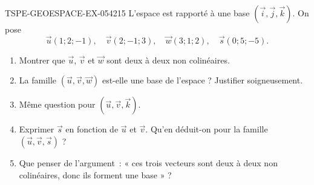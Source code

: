 \begin{exercice}{TSPE-GEOESPACE-EX-054}{2}{15}
L'espace est rapporté à une base $(\vec{i},\vec{j},\vec{k})$. On pose
\[
  \vec{u}(1;2;-1),\quad \vec{v}(2;-1;3),\quad \vec{w}(3;1;2),\quad
  \vec{s}(0;5;-5).
\]
\begin{enumerate}
  \item Montrer que $\vec{u}$, $\vec{v}$ et $\vec{w}$ sont deux à deux non
        colinéaires.
  \item La famille $(\vec{u},\vec{v},\vec{w})$ est-elle une base de l'espace ?
        Justifier soigneusement.
  \item Même question pour $(\vec{u},\vec{v},\vec{k})$.
  \item Exprimer $\vec{s}$ en fonction de $\vec{u}$ et $\vec{v}$. Qu'en
        déduit-on pour la famille $(\vec{u},\vec{v},\vec{s})$ ?
  \item Que penser de l'argument~: « ces trois vecteurs sont deux à deux non
        colinéaires, donc ils forment une base » ?
\end{enumerate}
\end{exercice}
